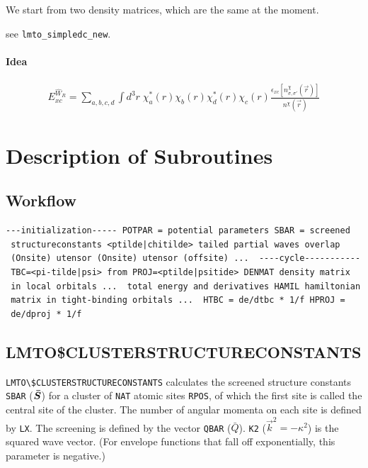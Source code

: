 \documentclass[11pt,a4paper]{report}
\begin{document}
We start from two density matrices, which are the same at the moment.

see \verb|lmto_simpledc_new|.




\subsubsection{Idea}
\begin{eqnarray}
E_{xc}^{\hat{W}_R}=\sum_{a,b,c,d}\int d^3r\; 
\chi^*_a(r)\chi_b(r)\chi^*_d(r)\chi_c(r)
\frac{\epsilon_{xc}[n^\chi_{\sigma,\sigma'}(\vec{r})]}
{n^\chi(\vec{r})}
\end{eqnarray}




\chapter{Description of Subroutines}
\section{Workflow}
\begin{verbatim}
---initialization----- POTPAR = potential parameters SBAR = screened
 structureconstants <ptilde|chitilde> tailed partial waves overlap
 (Onsite) utensor (Onsite) utensor (offsite) ...  ----cycle-----------
 TBC=<pi-tilde|psi> from PROJ=<ptilde|psitide> DENMAT density matrix
 in local orbitals ...  total energy and derivatives HAMIL hamiltonian
 matrix in tight-binding orbitals ...  HTBC = de/dtbc * 1/f HPROJ =
 de/dproj * 1/f
\end{verbatim}

\section{LMTO\$CLUSTERSTRUCTURECONSTANTS}
\verb|LMTO\$CLUSTERSTRUCTURECONSTANTS| calculates the screened
structure constants \verb|SBAR| ($\bm{\bar{S}}$) for a cluster of
\verb|NAT| atomic sites \verb|RPOS|, of which the first site is called
the central site of the cluster. The number of angular momenta on each
site is defined by \verb|LX|. The screening is defined by the vector
\verb|QBAR| ($\bar{Q}$). \verb|K2| ($\vec{k}^2=-\kappa^2$) is the
squared wave vector. (For envelope functions that fall off
exponentially, this parameter is negative.)
\end{document}
